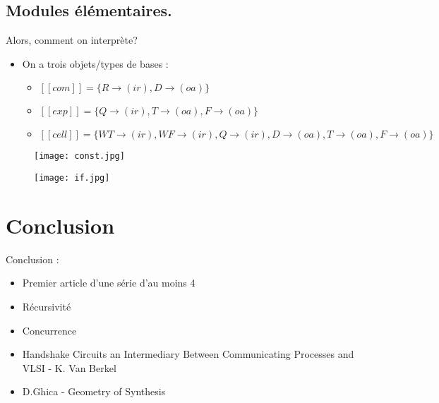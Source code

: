 \documentclass{beamer}
\newcommand\smt[1]{[\![#1]\!]}
\begin{document}
\subsection{Modules élémentaires.}

\begin{frame}{Alors, comment on interprète?}
\begin{itemize}
\item On a trois objets/types de bases :
\begin{itemize}
\item $\smt{com}=\{R\rightarrow(ir),D\rightarrow(oa)\}$
\item $\smt{exp}=\{Q\rightarrow(ir),T\rightarrow(oa),F\rightarrow(oa)\}$
\item $\smt{cell}=\{WT\rightarrow(ir),WF\rightarrow(ir),Q\rightarrow(ir),D\rightarrow(oa),T\rightarrow(oa),F\rightarrow(oa)\}$
\end{itemize}
\end{itemize}
\end{frame}

\begin{frame}

\begin{figure}[h]
\center
\texttt{[image: const.jpg]}
\end{figure}

\end{frame}

\begin{frame}

\begin{figure}[h]
\center
\texttt{[image: if.jpg]}
\end{figure}


\end{frame}
\section{Conclusion}

\begin{frame}
Conclusion :
\begin{itemize}
\item Premier article d'une série d'au moins 4
\pause
\item Récursivité
\pause
\item Concurrence 
\end{itemize}
\end{frame}

\begin{frame}
\begin{itemize}
\item Handshake Circuits an Intermediary Between Communicating Processes and
VLSI - K. Van Berkel
\item D.Ghica - Geometry of Synthesis
\end{itemize}
\end{frame}
\end{document}

